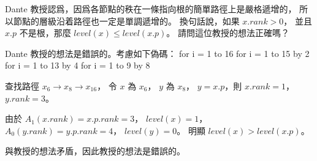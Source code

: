\startEXERCISE
Dante 教授認爲，因爲各節點的秩在一條指向根的簡單路徑上是嚴格遞增的，
所以節點的層級沿着路徑也一定是單調遞增的。
換句話說，如果 $x.rank > 0$，
並且 $x.p$ 不是根，那麼 $level(x)\le level(x.p)$。
請問這位教授的想法正確嗎？
\stopEXERCISE

\startANSWER
Dante 教授的想法是錯誤的。考慮如下偽碼：
\startCLRSCODE
for i = 1 to 16
for i = 1 to 15 by 2
for i = 1 to 13 by 4
for i = 1 to 9 by 8
\stopCLRSCODE

\externalfigure[e19_4-5-1][hfactor=fit]
\externalfigure[e19_4-5-2]
\externalfigure[e19_4-5-3]
\externalfigure[e19_4-5-4]
\externalfigure[e19_4-5-5]

查找路徑 $x_6\rightarrow x_8\rightarrow x_{16}$，
令 $x$ 為 $x_6$， $y$ 為 $x_8$， $y=x.p$，則 $x.rank = 1$， $y.rank = 3$。

由於 $A_1(x.rank)=x.p.rank = 3$， $level(x)=1$，
$A_0(y.rank)=y.p.rank = 4$， $level(y) = 0$。
明顯 $level(x) > level(x.p)$。

與教授的想法矛盾，因此教授的想法是錯誤的。
\stopANSWER